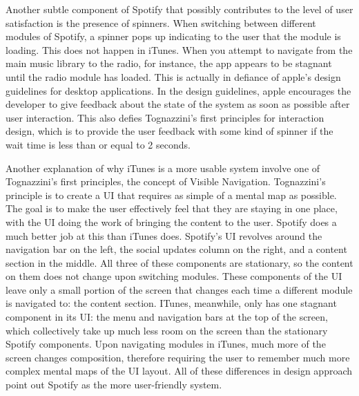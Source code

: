 \documentclass[12pt]{article}
\begin{document}
Another subtle component of Spotify that possibly contributes to 
the level of user satisfaction is the presence of spinners. When 
switching between different modules of Spotify, a spinner pops up 
indicating to the user that the module is loading. This does not 
happen in iTunes. When you attempt to navigate from the main music 
library to the radio, for instance, the app appears to be stagnant 
until the radio module has loaded. This is actually in defiance of 
apple's design guidelines for desktop applications. In the design 
guidelines, apple encourages the developer to give feedback about the state of the system as 
soon as possible after user interaction. This also defies Tognazzini's first principles 
for interaction design, which is to provide the user feedback with 
some kind of spinner if the wait time is less than or equal to 2 
seconds.

Another explanation of why iTunes is a more usable system involve 
one of Tognazzini's first principles, the concept of Visible 
Navigation. %
Tognazzini's principle is to create a UI that requires 
as simple of a mental map as possible. The goal is to make the 
user effectively feel that they are staying in one place, with the 
UI doing the work of bringing the content to the user. Spotify 
does a much better job at this than iTunes does. Spotify's UI 
revolves around the navigation bar on the left, the social updates 
column on the right, and a content section in the middle. All 
three of these components are stationary, so the content on them 
does not change upon switching modules. These components of the UI 
leave only a small portion of the screen that changes each time a 
different module is navigated to: the content section. ITunes, 
meanwhile, only has one stagnant component in its UI: the menu and 
navigation bars at the top of the screen, which collectively take 
up much less room on the screen than the stationary Spotify 
components. Upon navigating modules in iTunes, much more of the 
screen changes composition, therefore requiring the user to 
remember much more complex mental maps of the UI layout. All of 
these differences in design approach point out Spotify as the more 
user-friendly system.

\end{document}
